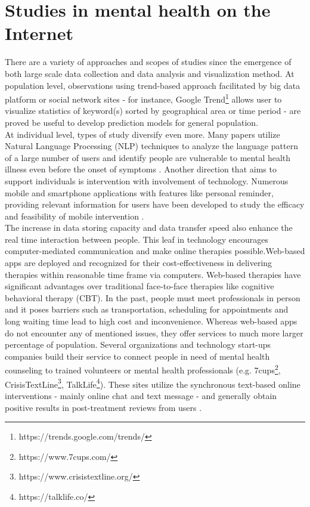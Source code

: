 \section{Studies in mental health on the Internet}
There are a variety of approaches and scopes of studies since the emergence of both large scale data collection and data analysis and visualization method. At population level, observations using trend-based approach facilitated by big data platform or social network sites - for instance, Google Trend\footnote{https://trends.google.com/trends/ } allows user to visualize statistics of keyword(s) sorted by geographical area or time period - are proved be useful to develop prediction models for general population. \\
At individual level, types of study diversify even more. Many papers utilize Natural Language Processing (NLP) techniques to analyze the language pattern of a large number of users and identify people are vulnerable to mental health illness even before the onset of symptoms \cite{Almeida, DeChoudhury2013}. Another direction that aims to support individuals is intervention with involvement of technology. Numerous mobile and smartphone applications with features like personal reminder, providing relevant information for users have been developed to study the efficacy and feasibility of mobile intervention \cite{Rathbone2017}. \\
The increase in data storing capacity and data transfer speed also enhance the real time interaction between people. This leaf in technology encourages computer-mediated communication and make online therapies possible.Web-based apps are deployed and recognized for their cost-effectiveness in delivering therapies within reasonable time frame via computers. Web-based therapies have significant advantages over traditional face-to-face therapies like cognitive behavioral therapy (CBT). In the past, people must meet professionals in person and it poses barriers such as transportation, scheduling for appointments and long waiting time lead to high cost and inconvenience. Whereas web-based apps do not encounter any of mentioned issues, they offer services to much more larger percentage of population. Several organizations and technology start-ups companies build their service to connect people in need of mental health counseling to trained volunteers or mental health professionals (e.g. 7cups\footnote{https://www.7cups.com/}, CrisisTextLine\footnote{https://www.crisistextline.org/}, TalkLife\footnote{https://talklife.co/}). These sites utilize the synchronous text-based online interventions - mainly online chat and text message - and generally obtain positive results in post-treatment reviews from users \cite{Hoermann2017}.\\
